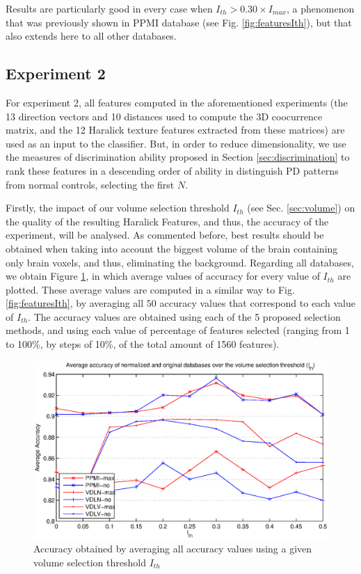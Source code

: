 Results are particularly good in every case when $I_{th} > 0.30\times I_{max}$, a phenomenon that was previously shown in PPMI database (see Fig. \ref{fig:featuresIth}), but that also extends here to all other databases. 


\subsection{Experiment 2}
For experiment 2, all features computed in the aforementioned experiments (the 13 direction vectors and 10 distances used to compute the 3D coocurrence matrix, and the 12 Haralick texture features extracted from these matrices) are used as an input to the classifier. But, in order to reduce dimensionality, we use the measures of discrimination ability proposed in Section \ref{sec:discrimination} to rank these features in a descending order of ability in distinguish PD patterns from normal controls, selecting the first $N$. 

Firstly, the impact of our volume selection threshold $I_{th}$ (see Sec. \ref{sec:volume}) on the quality of the resulting Haralick Features, and thus, the accuracy of the experiment, will be analysed. As commented before, best results should be obtained when taking into account the biggest volume of the brain containing only brain voxels, and thus, eliminating the background. Regarding all databases, we obtain Figure \ref{fig:averageAcc_IthNorm}, in which average values of accuracy for every value of $I_{th}$ are plotted. These average values are computed in a similar way to Fig. \ref{fig:featuresIth}, by averaging all $50$ accuracy values that correspond to each value of $I_{th}$. The accuracy values are obtained using each of the 5 proposed selection methods, and using each value of percentage of features selected (ranging from 1 to 100\%, by steps of 10\%, of the total amount of 1560 features). 

\begin{figure}[htp]
	\centering
	\includegraphics[width=0.90\columnwidth]{gfx/ch5/accuracyOverIth.eps}
	\caption{Accuracy obtained by averaging all accuracy values using a given volume selection threshold $I_{th}$}
	\label{fig:averageAcc_IthNorm}
\end{figure}

